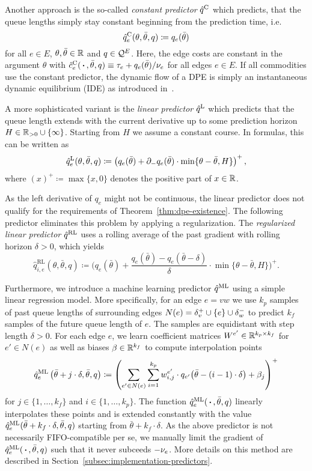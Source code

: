 Another approach is the so-called \emph{constant predictor} $\hat q^{\text{C}}$ which predicts, that the queue lengths simply stay constant beginning from the prediction time, i.e.
\[
    \hat q^{\text{C}}_{e}(\theta, \bar\theta, q) \coloneqq q_e(\bar\theta)
\]
for all $e\in E$, $\theta,\bar\theta\in\mathbb{R}$ and $q\in \mathcal{Q}^E$.
Here, the edge costs are constant in the argument $\theta$ with $\hat c^{\text{C}}_e(\,\boldsymbol{\cdot}\,, \bar\theta, q)\equiv \tau_e + q_e(\bar\theta)/\nu_e$ for all edges $e\in E$.
If all commodities use the constant predictor, the dynamic flow of a DPE is simply an instantaneous dynamic equilibrium (IDE) as introduced in~\cite[Definition~2.1]{Graf2020}.

A more sophisticated variant is the \emph{linear predictor} $\hat q^{\text{L}}$ which predicts that the queue length extends with the current derivative up to some prediction horizon $H\in \mathbb{R}_{>0} \cup \{ \infty \}$.
Starting from $H$ we assume a constant course.
In formulas, this can be written as \[
    \hat q^{\text{L}}_e(\theta,\bar\theta,q) \coloneqq \left( q_e(\bar\theta) + \partial_- q_e(\bar\theta) \cdot \min\{\theta - \bar\theta, H \} \right)^+,
\]
where $(x)^+\coloneqq \max\{ x, 0 \}$ denotes the positive part of $x\in\mathbb{R}$.

As the left derivative of $q_e$ might not be continuous, the linear predictor does not qualify for the requirements of Theorem~\ref{thm:dpe-existence}.
The following predictor eliminates this problem by applying a regularization.
The \emph{regularized linear predictor} $\hat q^{\text{RL}}$ uses a rolling average of the past gradient with rolling horizon $\delta>0$, which yields
\[
\hat q_{i,e}^{\text{RL}}(\theta, \bar\theta, q) \coloneqq
  \Big( q_e(\bar\theta) + \frac{q_e(\bar\theta) - q_e(\bar\theta - \delta)}{\delta} \cdot \min\{ \theta - \bar\theta, H \} \Big)^+.
\]

Furthermore, we introduce a machine learning predictor $\hat q^{\text{ML}}$ using a simple linear regression model.
More specifically, for an edge $e=vw$ we use $k_p$ samples of past queue lengths of surrounding edges $N(e) = \delta^+_{v} \cup \{ e \} \cup\delta^-_{w}$ to predict $k_f$ samples of the future queue length of $e$.
The samples are equidistant with step length $\delta > 0$.
For each edge $e$, we learn coefficient matrices $W^{e'}\in\mathbb{R}^{k_p\times k_f}$ for $e'\in N(e)$ as well as biases $\beta\in\mathbb{R}^{k_f}$ to compute interpolation points \[
    \hat q^{\text{ML}}_e\left(\bar\theta + j\cdot\delta,\bar\theta,q \right) \coloneqq 
    \left(
    \sum_{e'\in N(e)} \sum_{i = 1}^{k_p} w^{e'}_{i, j} \cdot {q_{e'}}{\left( 
        \bar\theta - (i-1)\cdot\delta
    \right)}
    + \beta_j
    \right)^+
\]
for $j\in\{1,\dots,k_f\}$ and $i\in\{1,\dots,k_p\}$.
The function $\hat q^{\text{ML}}_e(\,\boldsymbol{\cdot}\,, \bar\theta, q)$ linearly interpolates these points and is extended constantly with the value $\hat q^{\text{ML}}_e(\bar\theta + k_f\cdot\delta,\bar\theta,q )$ starting from $\bar\theta + k_f\cdot \delta$.
As the above predictor is not necessarily FIFO-compatible per se, we manually limit the gradient of $\hat q^{\text{ML}}_e(\,\boldsymbol{\cdot}\,, \bar\theta, q)$ such that it never subceeds $-\nu_e$.
More details on this method are described in Section~\ref{subsec:implementation-predictors}.

